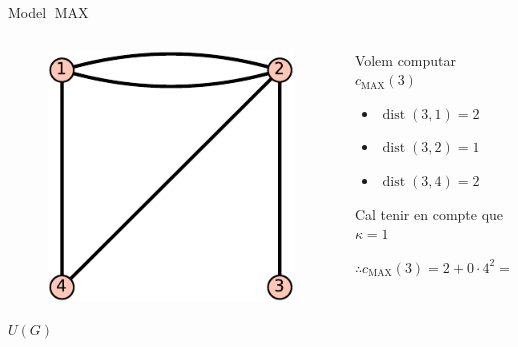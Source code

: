 \documentclass[aspectratio=169]{beamer}
\DeclareMathOperator{\dist}{dist}
\DeclareMathOperator{\MAX}{MAX}
\begin{document}
\begin{frame}{Model $\MAX$}
    \begin{columns}
        \begin{column}{0.5\textwidth}
        \centering
        \begin{figure}
        \includegraphics[scale=0.75]{u-crop}
        \end{figure}
        \vspace{-1em}
        {\large $U(G)$}
        \end{column}
        
        \begin{column}{0.5\textwidth}
        Volem computar $c_{\MAX}(3)$
        
        \vspace{1em}

        \begin{itemize}
            \item[] $\dist(3,1) = 2$ 
            \item[] $\dist(3,2) = 1$
            \item[] $\dist(3,4) = 2$ 
        \end{itemize}
        
        \vspace{1em}
        
        Cal tenir en compte que $\kappa = 1$
        
        \vspace{0.5em}
        
        
        $\therefore c_{\MAX}(3) = 2 + 0 \cdot 4^2 = 2$
        \end{column}
    \end{columns}
\end{frame}
\end{document}
